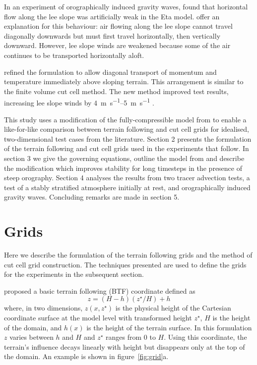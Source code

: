 \documentclass{ametsoc}
\begin{document}
In an experiment of orographically induced gravity waves, \citet{gallus-klemp2000} found that horizontal flow along the lee slope was artificially weak in the Eta model.  \citet{mesinger2012} offer an explanation for this behaviour: air flowing along the lee slope cannot travel diagonally downwards but must first travel horizontally, then vertically downward.  However, lee slope winds are weakened because some of the air continues to be transported horizontally aloft.

\citet{mesinger2012} refined the formulation to allow diagonal transport of momentum and temperature immediately above sloping terrain.  This arrangement is similar to the finite volume cut cell method.  The new method improved test results, increasing lee slope winds by \SIrange{4}{5}{\meter\per\second} \citep{mesinger2012}.

This study uses a modification of the fully-compressible model from \citet{weller-shahrokhi2014} to enable a like-for-like comparison between terrain following and cut cell grids for idealised, two-dimensional test cases from the literature.  Section 2 presents the formulation of the terrain following and cut cell grids used in the experiments that follow.  In section 3 we give the governing equations, outline the model from \citet{weller-shahrokhi2014} and describe the modification which improves stability for long timesteps in the presence of steep orography.  Section 4 analyses the results from two tracer advection tests, a test of a stably stratified atmosphere initially at rest, and orographically induced gravity waves.  Concluding remarks are made in section 5.


\section{Grids}
\label{sec:grid}

Here we describe the formulation of the terrain following grids and the method of cut cell grid construction.  The techniques presented are used to define the grids for the experiments in the subsequent section.

\citet{galchen-somerville1975} proposed a basic terrain following (BTF) coordinate defined as 
\begin{equation}
	z = \left( H - h \right) \left( z^\star / H \right) + h \label{eqn:btf}
\end{equation}
where, in two dimensions, \(z(x, z^\star)\) is the physical height of the Cartesian coordinate surface at the model level with transformed height \(z^\star\), \(H\) is the height of the domain, and \(h(x)\) is the height of the terrain surface.  In this formulation $z$ varies between $h$ and $H$ and $z^\star$ ranges from 0 to $H$.  Using this coordinate, the terrain's influence decays linearly with height but disappears only at the top of the domain.  An example is shown in figure~\ref{fig:grid}a.
\end{document}
